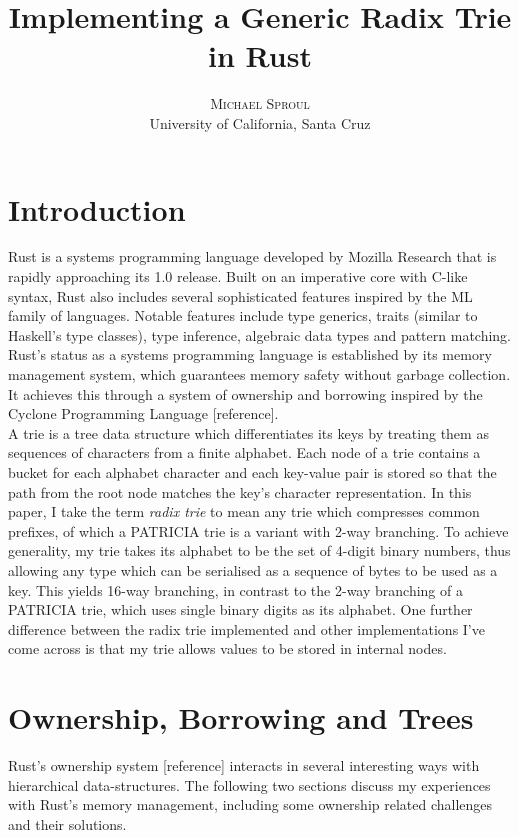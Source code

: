 \documentclass[a4paper,12pt]{article}
\title{
Implementing a Generic Radix Trie in Rust
}
\author{
\textsc{Michael Sproul}\\
University of California, Santa Cruz
}
\date{}
\begin{document}
\maketitle

\section{Introduction}

Rust is a systems programming language developed by Mozilla Research that is rapidly approaching its 1.0 release. Built on an imperative core with C-like syntax, Rust also includes several sophisticated features inspired by the ML family of languages. Notable features include type generics, traits (similar to Haskell's type classes), type inference, algebraic data types and pattern matching.  Rust's status as a systems programming language is established by its memory management system, which guarantees memory safety without garbage collection. It achieves this through a system of ownership and borrowing inspired by the Cyclone Programming Language [reference].\\

A trie is a tree data structure which differentiates its keys by treating them as sequences of characters from a finite alphabet. Each node of a trie contains a bucket for each alphabet character and each key-value pair is stored so that the path from the root node matches the key's character representation. In this paper, I take the term \textit{radix trie} to mean any trie which compresses common prefixes, of which a PATRICIA trie is a variant with 2-way branching. To achieve generality, my trie takes its alphabet to be the set of 4-digit binary numbers, thus allowing any type which can be serialised as a sequence of bytes to be used as a key. This yields 16-way branching, in contrast to the 2-way branching of a PATRICIA trie, which uses single binary digits as its alphabet. One further difference between the radix trie implemented and other implementations I've come across is that my trie allows values to be stored in internal nodes.

\section{Ownership, Borrowing and Trees}

Rust's ownership system [reference] interacts in several interesting ways with hierarchical data-structures. The following two sections discuss my experiences with Rust's memory management, including some ownership related challenges and their solutions.
\end{document}
